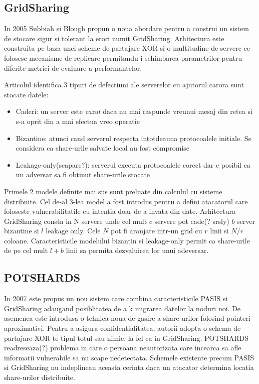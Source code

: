 \documentclass{llncs}
\begin{document}
\subsection{GridSharing} 
In 2005 Subbiah si Blough propun o noua abordare pentru a construi un sistem de stocare sigur si tolerant la erori numit GridSharing.
Arhitectura este construita pe baza unei scheme de partajare XOR si o multitudine de servere ce folosesc mecanisme de replicare permitandu-i schimbarea parametrilor pentru diferite metrici de evaluare a performantelor. \cite{SB:2005}

Articolul identifica 3 tipuri de defectiuni ale serverelor cu ajutorul carora sunt stocate datele:
\begin{itemize}
	\item Caderi: un server este \textit{cazut} daca nu mai raspunde vreunui mesaj din retea si s-a oprit din a mai efectua vreo operatie 
	\item Bizantine: atunci cand serverul respecta intotdeauna protocoalele initiale. Se considera ca share-urile salvate local au fost compromise
	\item Leakage-only(scapare?): serverul executa protocoalele corect dar e posibil ca un adversar sa fi obtinut share-urile stocate
\end{itemize}
Primele 2 modele definite mai sus sunt preluate din calculul cu sisteme distribuite. Cel de-al 3-lea model a fost introdus pentru a defini atacatorul care foloseste vulnerabilitatile cu intentia doar de a invata din date. Arhitectura GridSharing consta in N servere unde cel mult $c$ servere pot cade(? srsly) $b$ server bizantine si $l$ leakage only. Cele $N$ pot fi aranjate intr-un grid cu $r$ linii si $N/r$ coloane. Caracteristicile modelului bizantin si leakage-only permit ca share-urile de pe cel mult $l + b$ linii sa permita dezvaluirea lor unui adeversar.  

\subsection{POTSHARDS} 
In 2007 este propus un nou sistem care combina caracteristicile PASIS si GridSharing adaugand posiblitatea de a k migrarea datelor la noduri noi.
De asemenea este introdusa o tehnica noua de gasire a share-urilor folosind pointeri aproximativi. Pentru a asigura confidentialitatea, autorii adopta o schema de partajare XOR te tipul totul sau nimic, la fel ca in GridSharing.
POTSHARDS readreseaza(?) problema in care o persoana neautorizata care incearca sa afle informatii vulnerabile sa nu scape nedetectata. Schemele existente precum PASIS si GridSharing nu indeplineau aceasta cerinta daca un atacator determina locatia share-urilor distribuite.
\end{document}
